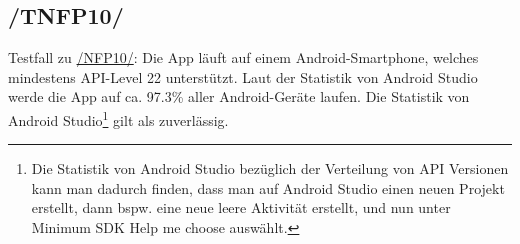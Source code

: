 \subsection*{/TNFP10/}
\label{/TNFP10/} Testfall zu \hyperref[/NFP10/]{/NFP10/}: Die App läuft auf einem \Gls{Android}-\Gls{Smartphone}, welches mindestens \Gls{API-Level} 22 unterstützt. Laut der Statistik von Android Studio werde die App auf ca. 97.3\% aller \Gls{Android}-Geräte laufen. Die Statistik von Android Studio\footnote{Die Statistik von Android Studio bezüglich der Verteilung von \Gls{API} Versionen kann man dadurch finden, dass man auf Android Studio einen neuen Projekt erstellt, dann bspw. eine neue leere Aktivität erstellt, und nun unter Minimum SDK \dq Help me choose\dq{} auswählt.} gilt als zuverlässig.